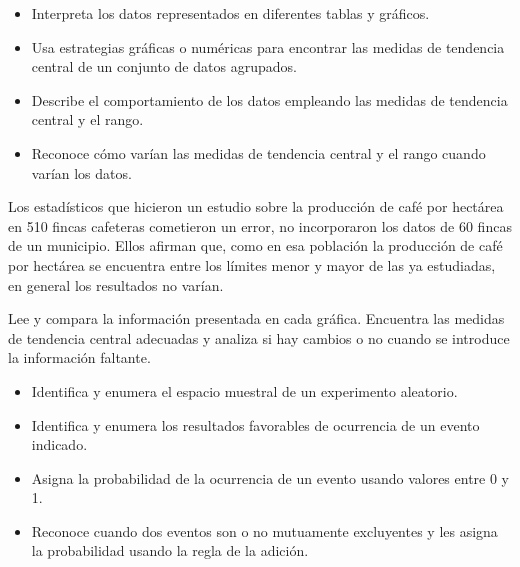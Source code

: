 \evidencias

\begin{itemize}
  \item Interpreta los datos representados en diferentes tablas y gráficos.
  \item Usa estrategias gráficas o numéricas para encontrar las medidas de tendencia central de un conjunto de datos agrupados.
  \item Describe el comportamiento de los datos empleando las medidas de tendencia central y el rango.
  \item Reconoce cómo varían las medidas de tendencia central y el rango cuando varían los datos.
\end{itemize}

\ejemplo

Los estadísticos que hicieron un estudio sobre la producción de café por hectárea en 510 fincas cafeteras cometieron un error, no incorporaron los datos de 60 fincas de un municipio. Ellos afirman que, como en esa población la producción de café por hectárea se encuentra entre los límites menor y mayor de las ya estudiadas, en general los resultados no varían.



Lee y compara la información presentada en cada gráfica. Encuentra las medidas de tendencia central adecuadas y analiza si hay cambios o no cuando se introduce la información faltante.



\evidencias

\begin{itemize}
  \item Identifica y enumera el espacio muestral de un experimento aleatorio.
  \item Identifica y enumera los resultados favorables de ocurrencia de un evento indicado.
  \item Asigna la probabilidad de la ocurrencia de un evento usando valores entre 0 y 1.
  \item Reconoce cuando dos eventos son o no mutuamente excluyentes y les asigna la probabilidad usando la regla de la adición.
\end{itemize}

